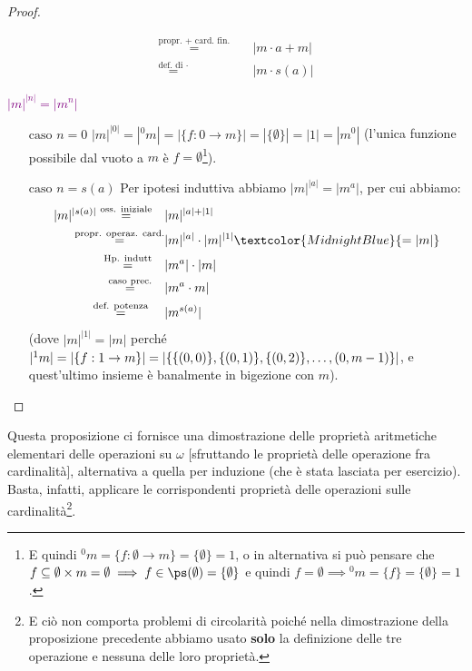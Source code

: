 \begin{proof}
\begin{itemize}
\[\begin{split}
						 \overset{\text{propr. $+$ card. fin.}}{=}\quad& |m \cdot a + m| \\
						 \overset{\text{def. di $\cdot$}}{=}\quad\;& |m \cdot s(a)|
 		\end{split} 
			\]
	\end{itemize}
	\textcolor{purple}{$|m|^{|n|} = |m^n|$}
	\begin{itemize}
		\item[$\boxed{\text{caso $n = 0$}}$] $|m|^{|0|} =  |{}^{0}m| = |\{f : 0 \rightarrow m\}| = |\{\emptyset\}| =  |1| = |m^0|$ (l'unica funzione possibile dal vuoto a $m$ è $f = \emptyset$\footnote{E quindi ${}^0m = \{f : \emptyset \rightarrow m\} = \{\emptyset\} = 1$, o in alternativa si può pensare che
		$f \subseteq \emptyset \times m = \emptyset \implies f \in \ps(\emptyset) = \{\emptyset\}$ e quindi $f = \emptyset \implies {}^0m = \{f\} = \{\emptyset\} = 1$.}).
		\item[$\boxed{\text{caso $n = s(a)$}}$] Per ipotesi induttiva abbiamo $|m|^{|a|} = |m^a|$, per cui abbiamo:
		\[ \begin{split}
			|m|^{|s(a)|} \overset{\text{oss. iniziale}}{=}\quad& |m|^{|a| + |1|} \\
						 \overset{\text{propr. operaz. card.}}{=}& |m|^{|a|} \cdot |m|^{|1|} \textcolor{MidnightBlue}{= |m| }\\
						 \overset{\text{Hp. indutt}}{=}\quad& |m^a| \cdot |m| \\
						 \overset{\text{caso prec.}}{=}\quad& |m^a \cdot m| \\
						 \overset{\text{def. potenza}}{=}\quad\;& |m^{s(a)}|
 		\end{split} 
			\]
		(dove $|m|^{|1|} = |m|$ perché $|{}^{1}m|  = |\{f : 1 \rightarrow m\}| = |\{\{(0,0)\},\{(0,1)\},\{(0,2)\},\ldots,\linebreak(0,m-1)\}|$, e quest'ultimo insieme è banalmente in bigezione con $m$).
	\end{itemize}
\end{proof}

\begin{note}
	Questa proposizione ci fornisce una dimostrazione delle proprietà aritmetiche elementari delle operazioni su $\omega$ [sfruttando le proprietà delle operazione fra cardinalità], alternativa a quella per induzione (che è stata lasciata per esercizio).
	Basta, infatti, applicare le corrispondenti proprietà delle operazioni sulle cardinalità\footnote{E ciò non comporta problemi di circolarità poiché nella dimostrazione della proposizione precedente abbiamo usato \textbf{solo} la definizione delle tre operazione e nessuna delle  loro proprietà.}.
\end{note}

